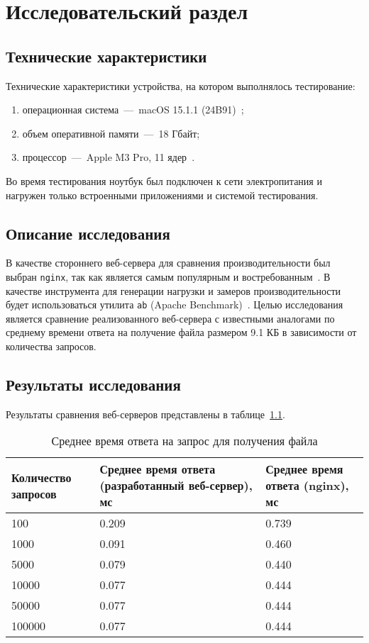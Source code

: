 \chapter{Исследовательский раздел}

\section{Технические характеристики}

Технические характеристики устройства, на котором выполнялось тестирование:
\begin{enumerate}
	\item операционная система~---~macOS 15.1.1 (24B91)~\cite{macos}; 
	\item объем оперативной памяти~---~18 Гбайт;
	\item процессор~---~Apple M3 Pro, 11 ядер~\cite{macos}.
\end{enumerate}

Во время тестирования ноутбук был подключен к сети электропитания и нагружен только встроенными приложениями и системой тестирования.

\section{Описание исследования}

В качестве стороннего веб-сервера для сравнения производительности был выбран \texttt{nginx}, так как является самым популярным и востребованным~\cite{nginx}.
В качестве инструмента для генерации нагрузки и замеров производительности будет использоваться утилита \texttt{ab} (Apache Benchmark)~\cite{ab}.
Целью исследования является сравнение реализованного веб-сервера с известными аналогами по среднему времени ответа на получение файла размером 9.1 КБ в зависимости от количества запросов.

\clearpage
\section{Результаты исследования}

Результаты сравнения веб-серверов представлены в таблице~\ref{table1}.
\begin{table}[!ht]
	\centering
	\caption{Среднее время ответа на запрос для получения файла}
	\label{table1}
	\begin{tabularx}{\textwidth}{|X|X|X|}
		\hline
		Количество запросов & Среднее время ответа (разработанный веб-сервер), мс & Среднее время ответа (nginx), мс \\ \hline
		100 & 0.209 & 0.739 \\ \hline
		1000 & 0.091 & 0.460 \\ \hline
		5000 & 0.079 & 0.440 \\ \hline
		10000 & 0.077 & 0.444 \\ \hline
		50000 & 0.077 & 0.444 \\ \hline
		100000 & 0.077 & 0.444 \\ \hline
	\end{tabularx}
\end{table}


